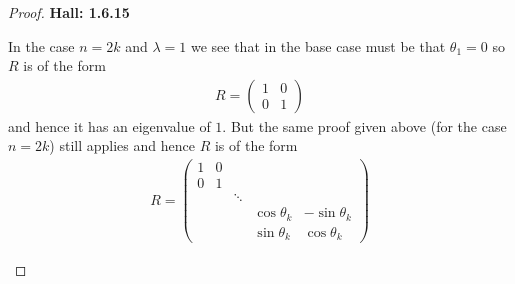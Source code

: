 \documentclass[11pt]{article}
\theoremstyle{definition}
\begin{document}
\begin{proof}{\textbf{Hall: 1.6.15}}
\begin{itemize}
    In the case $n = 2k$ and $\lambda= 1$ we see that in the base case must be
    that $\theta_1 = 0$ so $R$ is of the form
    \begin{align*}
        R = \begin{pmatrix} 1 & 0 \\ 0 & 1 \end{pmatrix}
    \end{align*}
    and hence it has an eigenvalue of $1$.
    But the same proof given above (for the case $n=2k$) still applies and
    hence $R$ is of the form 
    \begin{align*}
        R = \begin{pmatrix}
            1 & 0  &        &        & \\
            0 & 1  &        &        & \\
                   &        & \ddots &                & \\
                   &        &        & \cos\theta_{k} & -\sin\theta_{k} \\
                   &        &        & \sin\theta_{k} & \cos\theta_{k}
        \end{pmatrix}
    \end{align*}
\end{itemize}
\end{proof}
\end{document}
